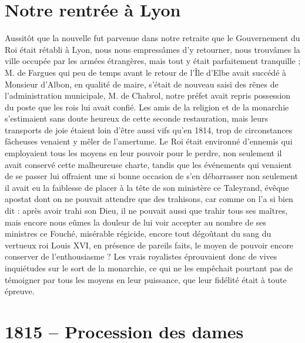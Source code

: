 \documentclass[11pt,a4paper]{report}
\begin{document}
\section*{Notre rentrée à Lyon}

Aussitôt que la nouvelle fut parvenue dans notre retraite que le Gouvernement du Roi était rétabli à Lyon, nous nous empressâmes d'y retourner, nous trouvâmes la ville occupée par les armées étrangères, mais tout y était parfaitement tranquille ; M. de Fargues qui peu de temps avant le retour de l'Île d'Elbe avait succédé à Monsieur d'Albon, en qualité de maire, s'était de nouveau saisi des rênes de l'administration municipale, M. de Chabrol, notre préfet avait repris possession du poste que les rois lui avait confié. Les amis de la religion et de la monarchie s'estimaient sans doute heureux de cette seconde restauration, mais leurs transports de joie étaient loin d'être aussi vifs qu'en 1814, trop de circonstances fâcheuses venaient y mêler de l'amertume. Le Roi était environné d'ennemis qui employaient tous les moyens en leur pouvoir pour le perdre, non seulement il avait conservé cette malheureuse charte, tandis que les événements qui venaient de se passer lui offraient une si bonne occasion de s'en débarrasser non seulement il avait eu la faiblesse de placer à la tête de son ministère ce Taleyrand, évêque apostat dont on ne pouvait attendre que des trahisons, car comme on l'a si bien dit : après avoir trahi son Dieu, il ne pouvait aussi que trahir tous ses maîtres, mais encore nous eûmes la douleur de lui voir accepter au nombre de ses ministres ce Fouché, misérable régicide, encore tout dégoûtant du sang du vertueux roi Louis XVI, en présence de pareils faits, le moyen de pouvoir encore conserver de l'enthousiasme ? Les vrais royalistes éprouvaient donc de vives inquiétudes sur le sort de la monarchie, ce qui ne les empêchait pourtant pas de témoigner par tous les moyens en leur puissance, que leur fidélité était à toute épreuve.

\section*{1815 -- Procession des dames}
\end{document}
